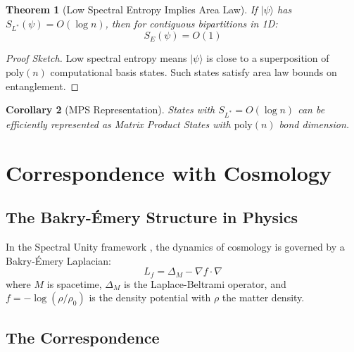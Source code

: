 \documentclass[11pt,a4paper]{article}
\theoremstyle{plain}
\newtheorem{theorem}{Theorem}[section]
\newtheorem{corollary}[theorem]{Corollary}
\theoremstyle{definition}
\theoremstyle{remark}
\newcommand{\ket}[1]{|#1\rangle}
\begin{document}
\begin{theorem}[Low Spectral Entropy Implies Area Law]\label{thm:area-law}
If $\ket{\psi}$ has $S_{L^*}(\psi) = O(\log n)$, then for contiguous bipartitions in 1D:
\begin{equation}
    S_E(\psi) = O(1)
\end{equation}
\end{theorem}

\begin{proof}[Proof Sketch]
Low spectral entropy means $\ket{\psi}$ is close to a superposition of $\text{poly}(n)$ computational basis states. Such states satisfy area law bounds on entanglement.
\end{proof}

\begin{corollary}[MPS Representation]
States with $S_{L^*} = O(\log n)$ can be efficiently represented as Matrix Product States with $\text{poly}(n)$ bond dimension.
\end{corollary}

\section{Correspondence with Cosmology}\label{sec:correspondence}

\subsection{The Bakry-\'Emery Structure in Physics}

In the Spectral Unity framework \cite{spectral-unity,self-ref-cosmology}, the dynamics of cosmology is governed by a Bakry-\'Emery Laplacian:
\begin{equation}
    L_f = \Delta_M - \nabla f \cdot \nabla
\end{equation}
where $M$ is spacetime, $\Delta_M$ is the Laplace-Beltrami operator, and $f = -\log(\rho/\rho_0)$ is the density potential with $\rho$ the matter density.

\subsection{The Correspondence}
\end{document}
